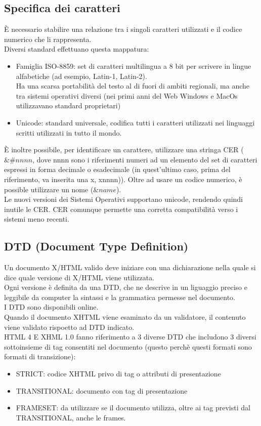 \documentclass{article}
\begin{document}
\subsection{Specifica dei caratteri}
È necessario stabilire una relazione tra i singoli caratteri utilizzati e il codice numerico che li rappresenta.\\
Diversi standard effettuano questa mappatura:
\begin{itemize}
	\item Famiglia ISO-8859: set di caratteri multilingua a 8 bit per scrivere in lingue alfabetiche (ad esempio, Latin-1, Latin-2).\\
	Ha una scarsa portabilità del testo al di fuori di ambiti regionali, ma anche tra sistemi operativi diversi (nei primi anni del Web Windows e MacOs utilizzavano standard proprietari)
	\item Unicode: standard universale, codifica tutti i caratteri utilizzati nei linguaggi scritti utilizzati in tutto il mondo.
\end{itemize}
È inoltre possibile, per identificare un carattere, utilizzare una stringa CER ($ \& \# nnnn$, dove nnnn sono i riferimenti numeri ad un elemento del set di caratteri espressi in forma decimale o esadecimale (in quest'ultimo caso, prima del riferimento, va inserita una x, xnnnn)). Oltre ad usare un codice numerico, è possible utilizzare un nome ($\& name$).\\
Le nuovi versioni dei Sistemi Operativi supportano unicode, rendendo quindi inutile le CER. CER comunque permette una corretta compatibilità verso i sistemi meno recenti.
\subsection{DTD (Document Type Definition)}
Un documento X/HTML valido deve iniziare con una dichiarazione nella quale si dice quale versione di X/HTML viene utilizzata. \\
Ogni versione  è definita da una DTD, che ne descrive in un liguaggio preciso e leggibile da computer la sintassi e la grammatica permesse nel documento.\\
I DTD sono disponibili online.\\
Quando il documento XHTML viene esaminato da un validatore, il contenuto viene validato rispoetto ad DTD indicato. \\
HTML 4 E XHML 1.0 fanno riferimento a 3 diverse DTD che includono 3 diversi sottoinsieme di tag consentiti nel documento (questo perchè questi formati sono formati di transizione):
\begin{itemize}
	\item STRICT: codice XHTML privo di tag o attributi di presentazione
	\item TRANSITIONAL: documento con tag di presentazione
	\item FRAMESET: da utilizzare se il documento utilizza, oltre ai tag previsti dal TRANSITIONAL, anche le frames.
\end{itemize}
\end{document}

